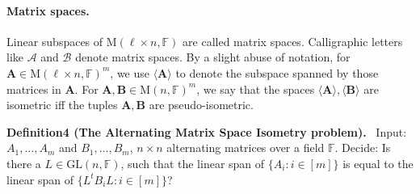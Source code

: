 \documentclass[10pt,a4paper]{article}
\newenvironment{authorclaim}[1]{\par\medskip\noindent\textbf{#1.}\ }{\par\medskip}
\begin{document}
\paragraph{Matrix spaces.} Linear subspaces of $\mathrm M(\ell\times n,\mathbb F)$ are called matrix spaces. Calligraphic letters like $\mathcal A$ and $\mathcal B$ denote matrix spaces. By a slight abuse of notation, for $\mathbf A\in\mathrm M(\ell\times n,\mathbb F)^m$, we use $\langle\mathbf A\rangle$ to denote the subspace spanned by those matrices in $\mathbf A$. For $\mathbf A,\mathbf B\in\mathrm M(n,\mathbb F)^m$, we say that the spaces $\langle\mathbf A\rangle,\langle\mathbf B\rangle$ are isometric iff the tuples $\mathbf A,\mathbf B$ are pseudo-isometric.
\begin{authorclaim}{Definition4 (The Alternating Matrix Space Isometry problem)}
Input: $A_1,\ldots,A_m$ and $B_1,\ldots,B_m$, $n\times n$ alternating matrices over a field $\mathbb F$.
Decide: Is there a $L\in\mathrm{GL}(n,\mathbb F)$, such that the linear span of $\{A_i:i\in[m]\}$ is equal to the linear span of $\{L^tB_iL:i\in[m]\}$?
\end{authorclaim}
\end{document}
